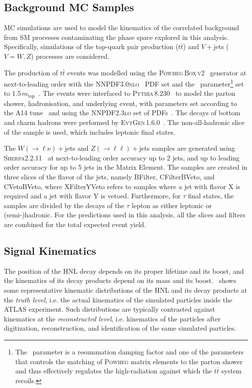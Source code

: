 \subsection{Background MC Samples}
MC simulations are used to model the kinematics of the correlated background from SM processes contaminating the phase space explored in this analysis. Specifically, simulations of the top-quark pair production ($t\bar{t}$) and $V+$jets ($V=W,\xspace Z$) processes are considered.

The production of $t\bar{t}$ events was modelled using the \textsc{Powheg\,Box\,v2}~\cite{Frixione:2007nw,Nason:2004rx,Frixione:2007vw,Alioli:2010xd} generator at next-to-leading order with the \textsc{NNPDF3.0nlo}~\cite{Ball:2014uwa} PDF set and the \hdamp~parameter\footnote{The \hdamp~parameter is a resummation damping factor and one of the parameters that controls the matching of \textsc{Powheg} matrix elements to the parton shower and thus effectively regulates the high-\pT radiation against which the $t\bar{t}$ system recoils.} set to 1.5\,$m_{\mathrm{top}}$~\cite{ATL-PHYS-PUB-2016-020}.  The events were interfaced to \textsc{Pythia\,8.230}~\cite{Sjostrand:2014zea} to model the parton shower, hadronisation, and underlying event, with parameters set according to the A14 tune~\cite{ATL-PHYS-PUB-2014-021} and using the \textsc{NNPDF2.3lo} set of PDFs~\cite{Ball:2012cx}. The decays of bottom and charm hadrons were performed by \textsc{EvtGen\,1.6.0}~\cite{Lange:2001uf}. The non-all-hadronic slice of the sample is used, which includes leptonic final states.

The $W(\rightarrow \ell\nu)+$jets and $Z(\rightarrow \ell\ell)+$jets samples are generated using \textsc{Sherpa2.2.11}~\cite{Gleisberg:2008ta,Hoeche:2009rj,Bothmann:2019yzt} at next-to-leading order accuracy up to 2 jets, and up to leading order accuracy for up to 5 jets in the Matrix Element. The samples are created in three slices of the flavor of the jets, namely BFilter, CFilterBVeto, and CVetoBVeto, where XFilterYVeto refers to samples where a jet with flavor X is required and a jet with flavor Y is vetoed. Furthermore, for $\tau$ final states, the samples are divided by the decays of the $\tau$ lepton as either leptonic or (semi-)hadronic. For the predictions used in this analysis, all the slices and filters are combined for the total expected event yield.
 
\subsection{Signal Kinematics}
The position of the HNL decay depends on its proper lifetime and its boost, and the kinematics of its decay products depend on its mass and its boost.~ shows some representative kinematic distributions of the HNL and its decay products at the \textit{truth level}, i.e. the actual kinematics of the simulated particles inside the ATLAS experiment. Such distributions are typically contrasted against kinematics at the \textit{reconstructed level}, i.e. kinematics of the particles after digitization, reconstruction, and identification of the same simulated particles.

